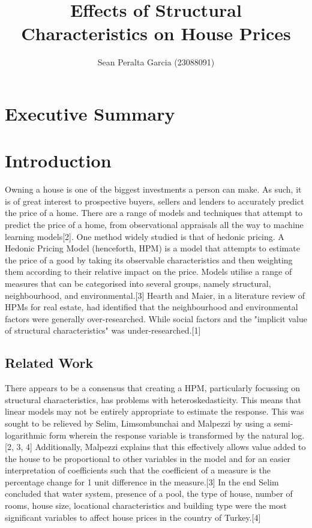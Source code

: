 \documentclass[10pt,A4,makeidx]{article}
\title
{Effects of Structural Characteristics on House Prices}
\author{Sean Peralta Garcia (23088091)}
\date {}
\begin{document}
\maketitle


\section{Executive Summary}
\section{Introduction}
  Owning a house is one of the biggest investments a person can make. As such, it 
  is of great interest to prospective buyers, sellers and lenders to accurately
  predict the price of a home. There are a range of models and techniques that 
  attempt to predict the price of a home, from observational appraisals all 
  the way to machine learning models[2]. One method widely studied is that of
  hedonic pricing. A Hedonic Pricing Model (henceforth, HPM) is a model that 
  attempts to estimate the price of a good by taking its observable characteristics
  and then weighting them according to their relative impact on the price. Models
  utilise a range of measures that can be categorised into several groups, 
  namely structural, neighbourhood, and environmental.[3] Hearth and Maier,
  in a literature review of HPMs for real estate, had identified that the 
  neighbourhood and environmental factors were generally over-researched. While
  social factors and the "implicit value of structural characteristics" was 
  under-researched.[1]

  \subsection{Related Work}
  There appears to be a consensus that creating a HPM, particularly focussing on
  structural characteristics, has problems with heteroskedasticity. This means
  that linear models may not be entirely appropriate to estimate the response.
  This was sought to be relieved by Selim, Limsombunchai and Malpezzi by using
  a semi-logarithmic form wherein the response variable is transformed by the natural log.[2, 3, 4]
  Additionally, Malpezzi explains
  that this effectively allows value added to the house to be proportional to 
  other variables in the model and for an easier interpretation of coefficients
  such that the coefficient of a measure is the percentage change for 1 unit 
  difference in the measure.[3]
  In the end Selim concluded that water system, presence of a pool, the type of house,
  number of rooms, house size, locational characteristics and building type were
  the most significant variables to affect house prices in the country of Turkey.[4]
    
\end{document}
